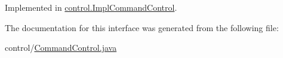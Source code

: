 Implemented in \mbox{\hyperlink{classcontrol_1_1_impl_command_control_a5736ac91cdc39805dc27c6af0c9935cb}{control.\+Impl\+Command\+Control}}.



The documentation for this interface was generated from the following file\+:\begin{DoxyCompactItemize}
\item 
control/\mbox{\hyperlink{_command_control_8java}{Command\+Control.\+java}}\end{DoxyCompactItemize}
